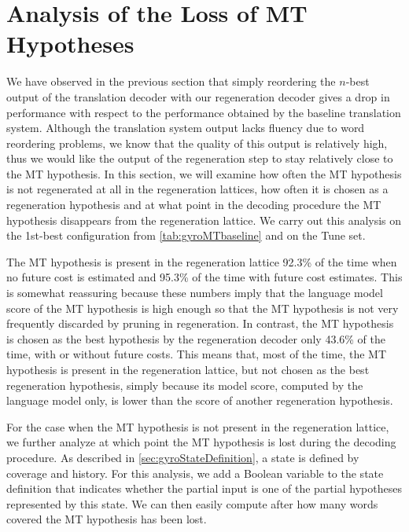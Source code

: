 \section{Analysis of the Loss of MT Hypotheses}
\label{sec:gyroTransErrorAnalysis}


We have observed in the previous section that simply reordering the $n$-best output
of the translation decoder with our regeneration decoder gives a drop
in performance with respect to the performance obtained by the
baseline translation system.
Although the translation system output lacks fluency due to word reordering
problems, we know that the quality of this output is relatively high, thus
we would like the output of the regeneration step to stay relatively close
to the MT hypothesis.
In this section, we will examine how often the MT
hypothesis is not regenerated at all in the regeneration lattices, how often it is
chosen as a regeneration hypothesis and at what point in the decoding procedure
the MT hypothesis disappears from the regeneration lattice.
We carry out this analysis on the 1st-best configuration from
\autoref{tab:gyroMTbaseline} and on the Tune set.

The MT hypothesis is present in the regeneration lattice
92.3\% of the time when no future cost is estimated and
95.3\% of the time with future cost estimates. This is somewhat reassuring
because these numbers imply that the language model score of the MT
hypothesis is high enough so that the MT hypothesis is not very frequently discarded
by pruning in regeneration.
In contrast, the MT hypothesis is chosen as the
best hypothesis by the regeneration decoder only 43.6\% of the time, with
or without future costs. This means that, most of the time, the MT
hypothesis is present in the regeneration lattice, but not chosen as
the best regeneration hypothesis, simply because its model score, computed
by the language model only, is lower than the score of another
regeneration hypothesis.

For the case when the MT hypothesis is not present in the regeneration
lattice, we further analyze at which point the MT hypothesis is lost
during the decoding procedure. As described in \autoref{sec:gyroStateDefinition},
a state is defined by coverage and history. For this analysis, we
add a Boolean variable to the state definition that indicates whether
the partial input is one of the partial hypotheses represented by this state.
We can then easily compute after how many words covered the MT hypothesis
has been lost.

